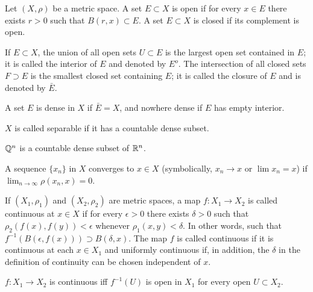 \begin{definition}
    Let $(X, \rho)$ be a metric space.
    A set $E \subset X$ is open if for every $x \in E$ there exists $r > 0$ such that $B(r, x) \subset E$.
    A set $E \subset X$ is closed if its complement is open. 
\end{definition}

\begin{definition}
    If $E \subset X$, the union of all open sets $U \subset E$ is the largest open set contained in $E$; it is called the interior of $E$ and denoted by $E^o$.
    The intersection of all closed sets $F \supset E$ is the smallest closed set containing $E$; it is called the closure of $E$ and is denoted by $\bar{E}$.
\end{definition}

\begin{definition}
    A set $E$ is dense in $X$ if $\bar{E} = X$, and nowhere dense if $E$ has empty interior. 
\end{definition}

\begin{definition}
    $X$ is called separable if it has a countable dense subset.
\end{definition}

\begin{example}
    $\mathbb{Q}^n$ is a countable dense subset of $\mathbb{R}^n$.
\end{example}

\begin{definition}
    A sequence $\{ x_n \}$ in $X$ converges to $x \in X$ (symbolically, $x_n \to x$ or $\lim x_n = x$) if $\lim _{n \to \infty} \rho(x_n, x) = 0$.
\end{definition}

\begin{definition}[Continuity]
    If $(X_1, \rho_1)$ and $(X_2, \rho_2)$ are metric spaces, a map $f: X_1 \to X_2$ is called continuous at $x \in X$ if for every $\epsilon > 0$ there exists $\delta > 0$ such that $\rho_2(f(x), f(y)) < \epsilon$ whenever $\rho_1(x, y) < \delta$. 
    In other words, such that $f^{-1} \left( B(\epsilon, f(x)) \right) \supset B(\delta, x)$.
    The map $f$ is called continuous if it is continuous at each $x \in X_1$ and uniformly continuous if, in addition, the $\delta$ in the definition of continuity can be chosen independent of $x$.
\end{definition}

\begin{proposition}
    $f: X_1 \to X_2$ is continuous iff $f^{-1}(U)$ is open in $X_1$ for every open $U \subset X_2$.
\end{proposition}

